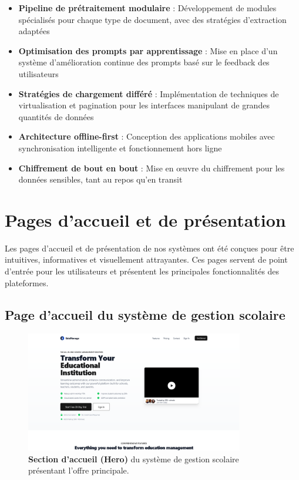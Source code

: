 \begin{itemize}
  \item \textbf{Pipeline de prétraitement modulaire} : Développement de modules spécialisés pour chaque type de document, avec des stratégies d'extraction adaptées
  
  \item \textbf{Optimisation des prompts par apprentissage} : Mise en place d'un système d'amélioration continue des prompts basé sur le feedback des utilisateurs
  
  \item \textbf{Stratégies de chargement différé} : Implémentation de techniques de virtualisation et pagination pour les interfaces manipulant de grandes quantités de données
  
  \item \textbf{Architecture offline-first} : Conception des applications mobiles avec synchronisation intelligente et fonctionnement hors ligne
  
  \item \textbf{Chiffrement de bout en bout} : Mise en œuvre du chiffrement pour les données sensibles, tant au repos qu'en transit
\end{itemize}

\section{Pages d'accueil et de présentation}

Les pages d'accueil et de présentation de nos systèmes ont été conçues pour être intuitives, informatives et visuellement attrayantes. Ces pages servent de point d'entrée pour les utilisateurs et présentent les principales fonctionnalités des plateformes.

\subsection{Page d'accueil du système de gestion scolaire}

\begin{figure}[H]
  \centering
  \includegraphics[width=0.85\textwidth,keepaspectratio]{pfe-pics/landing/hero.png}
  \caption{\textbf{Section d'accueil (Hero)} du système de gestion scolaire présentant l'offre principale.}
  \label{fig:landing_hero}
\end{figure}

